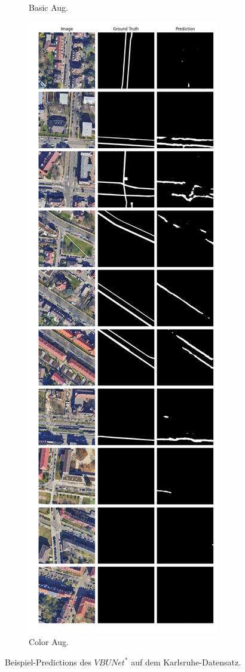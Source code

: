 \begin{figure}
\begin{subfigure}{.4\textwidth}
		\caption{Basic Aug.}
	\end{subfigure}
	\begin{subfigure}{.4\textwidth}
		\centering
		\includegraphics[width=1.\textwidth]{Bilder/karlsruhe-color-samples/vbunet-s.png}
		\caption{Color Aug.}
	\end{subfigure}
	\caption{Beispiel-Predictions des $VBUNet^*$ auf dem Karlsruhe-Datensatz.}
	\label{fig:ka-samples-vbunet-s}
\end{figure}


